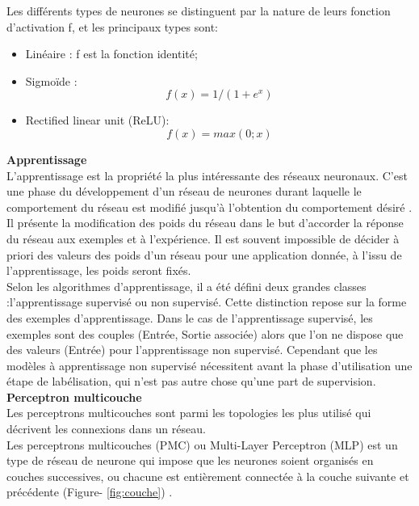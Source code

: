 Les différents types de neurones se distinguent par la nature de leurs fonction d’activation f, et les principaux types sont:

\begin{itemize}
    \item Linéaire :   f est la fonction identité;
    \item Sigmoïde : \[f(x)=1/(1+e^{x})\] 
    \item Rectified linear unit (ReLU): \[f(x)=max(0;x)\] 
\end{itemize}
\newpage
{\textbf{Apprentissage}}\\

L'apprentissage est la propriété la plus intéressante des réseaux neuronaux. C’est une phase du développement d'un réseau de neurones durant laquelle le comportement du réseau est modifié jusqu'à l'obtention du comportement désiré \cite{38}.\\
Il présente la modification des poids du réseau dans le but d'accorder la réponse du réseau aux exemples et à l'expérience. Il est souvent impossible de décider à priori des valeurs des poids d'un réseau pour une application donnée, à l'issu de l'apprentissage, les poids seront fixés.\\
Selon les algorithmes d'apprentissage, il a été défini deux grandes classes :l'apprentissage supervisé ou non supervisé. Cette distinction repose sur la forme des exemples d'apprentissage. Dans le cas de l'apprentissage supervisé, les exemples sont des couples (Entrée, Sortie associée) alors que l'on ne dispose que des valeurs (Entrée) pour l'apprentissage non supervisé. Cependant que les modèles à apprentissage non supervisé nécessitent avant la phase d'utilisation une étape de labélisation, qui n'est pas autre chose qu'une part de supervision.\\

{\textbf{Perceptron multicouche}}\\

Les perceptrons multicouches sont parmi les topologies les plus utilisé qui décrivent les connexions dans un réseau.\\
Les perceptrons multicouches (PMC) ou Multi-Layer Perceptron (MLP) est un type de réseau de neurone qui impose que les neurones soient organisés en couches successives, ou chacune est entièrement connectée à la couche suivante et précédente (Figure- \ref{fig:couche}) \cite{48}.

